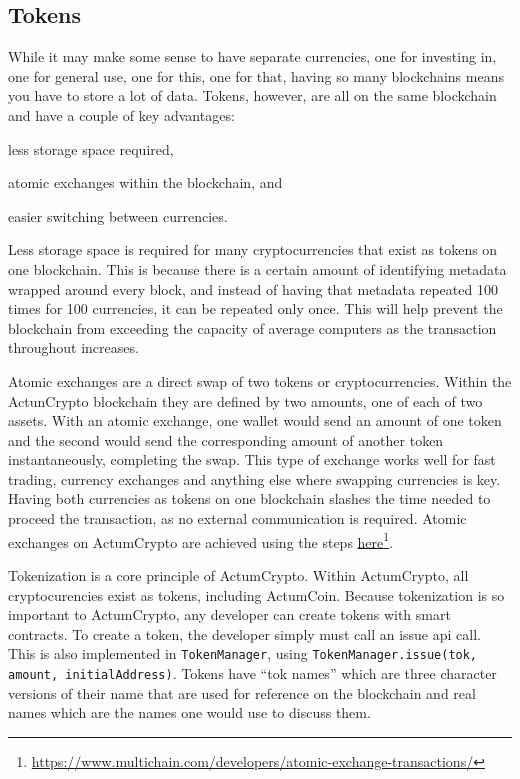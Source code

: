 \documentclass[letter]{article}
\newcommand{\footlink}[2]{\href{#1}{#2}\footnote{\url{#1}}}
\begin{document}
\subsection{Tokens}
While it may make some sense to have separate currencies, one for investing in, one for general use, one for this, one for that, having so many blockchains means you have to store a lot of data. Tokens, however, are all on the same blockchain and have a couple of key advantages: \begin{enumerate*}[label=(\alph*)]\item less storage space required, \item atomic exchanges within the blockchain, and \item easier switching between currencies.\end{enumerate*}

Less storage space is required for many cryptocurrencies that exist as tokens on one blockchain. This is because there is a certain amount of identifying metadata wrapped around every block, and instead of having that metadata repeated 100 times for 100 currencies, it can be repeated only once. This will help prevent the blockchain from exceeding the capacity of average computers as the transaction throughout increases.

Atomic exchanges are a direct swap of two tokens or cryptocurrencies. Within the ActunCrypto blockchain they are defined by two amounts, one of each of two assets. With an atomic exchange, one wallet would send an amount of one token and the second would send the corresponding amount of another token instantaneously, completing the swap. This type of exchange works well for fast trading, currency exchanges and anything else where swapping currencies is key. Having both currencies as tokens on one blockchain slashes the time needed to proceed the transaction, as no external communication is required. Atomic exchanges on ActumCrypto are achieved using the steps \footlink{https://www.multichain.com/developers/atomic-exchange-transactions/}{here}.


Tokenization is a core principle of ActumCrypto. Within ActumCrypto, all cryptocurencies exist as tokens, including ActumCoin. Because tokenization is so important to ActumCrypto, any developer can create tokens with smart contracts. To create a token, the developer simply must call an issue api call. This is also implemented in \texttt{TokenManager}, using \texttt{TokenManager.issue(tok, amount, initialAddress)}. Tokens have ``tok names'' which are three character versions of their name that are used for reference on the blockchain and real names which are the names one would use to discuss them.
\end{document}
